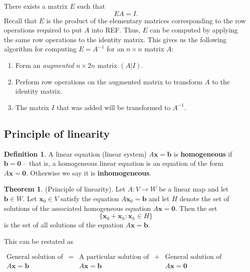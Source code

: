 \documentclass[12pt, a4paper]{article}
\theoremstyle{definition}
\newtheorem{definition}{Definition}[section]
\newtheorem{theorem}{Theorem}[section]
\theoremstyle{plain}
\newcommand{\vect}[1]{\mathbf{#1}}
\begin{document}
There exists a matrix $E$ such that $$EA=I.$$ Recall that $E$ is the product of the elementary matrices corresponding  to the row operations required to put $A$ into REF. Thus, $E$ can be computed by applying the same row operations to the identity matrix. This gives us the following algorithm for computing $E=A^{-1}$ for an $n\times n$ matrix $A$:

\begin{enumerate}
	
	\item Form an \textit{augmented} $n\times2n$ matrix $(A | I).$

	\item Perform row operations on the augmented matrix to transform $A$ to the identity matrix.

	\item The matrix $I$ that was added will be transformed to $A^{-1}.$

\end{enumerate}

\subsection{Principle of linearity}

\begin{definition} A linear equation (linear system) $A\vect{x} = \vect{b}$ is \textbf{homogeneous} if $\vect{b = 0}$ -- that is, a homogeneous linear equation is an equation of the form $A\vect{x} = \vect{0}.$ Otherwise we say it is \textbf{inhomogeneous}. \end{definition}

\begin{theorem} (Principle of linearity). Let $A : V \rightarrow W$ be a linear map and let $\vect{b} \in W.$  Let $\vect{x}_0 \in V$ satisfy the equation $A\vect{x}_0 = \vect{b}$ and let $H$ denote the set of solutions of the associated homogeneous equation $A\vect{x} = \vect{0}.$ Then the set $$\{\vect{x}_0+\vect{x}_h:\vect{x}_h \in H\}$$ is the set of all solutions of the equation $A\vect{x} = \vect{b}.$
\end{theorem}

This can be restated as 

\begin{tcolorbox}
$\begin{matrix}
\text{General solution of} &=& \text{A particular solution of} &+&  \text{General solution of}\\
A\vect{x} = \vect{b} && A\vect{x} = \vect{b} && A\vect{x} = \vect{0}
\end{matrix}$
\end{tcolorbox}
\end{document}
